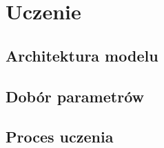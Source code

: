 \chapter{Uczenie} 
{


    \section{Architektura modelu}
    {

    }

    \section{Dobór parametrów}
    {

    }

    \section{Proces uczenia}
    {

    }
}